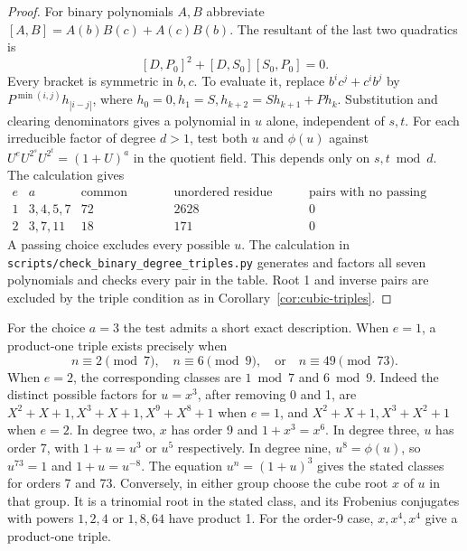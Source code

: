 \documentclass[11pt]{article}
\begin{document}
\begin{proof}
For binary polynomials \(A,B\) abbreviate
\([A,B]=A(b)B(c)+A(c)B(b)\). The resultant of the last two quadratics is
\[
            [D,P_0]^2+[D,S_0][S_0,P_0]=0.
\]
Every bracket is symmetric in \(b,c\). To evaluate it, replace
\(b^ic^j+c^ib^j\) by \(P^{\min(i,j)}h_{|i-j|}\), where
\(h_0=0,h_1=S,h_{k+2}=S h_{k+1}+P h_k\). Substitution and clearing
denominators gives a polynomial in \(u\) alone, independent of \(s,t\).
For each irreducible factor of degree \(d>1\), test both \(u\) and
\(\phi(u)\) against \(U^e U^{2^s}U^{2^t}=(1+U)^a\) in the quotient
field. This depends only on \(s,t\bmod d\). The calculation gives
\[
\begin{array}{c|l|r|r|r}
 e & a & \text{common period} & \text{unordered residue pairs} &
       \text{pairs with no passing choice}\\ \hline
 1&3,4,5,7&72&2628&0\\
 2&3,7,11&18&171&0
\end{array}
\]
A passing choice excludes every possible \(u\). The calculation in
\nolinkurl{scripts/check_binary_degree_triples.py} generates and factors
all seven polynomials and checks every pair in the table. Root 1 and
inverse pairs are excluded by the triple condition as in
Corollary~\ref{cor:cubic-triples}.
\end{proof}

For the choice \(a=3\) the test admits a short exact description.
When \(e=1\), a product-one triple exists precisely when
\[
           n\equiv2\pmod7,\quad n\equiv6\pmod9,\quad\text{or}\quad
           n\equiv49\pmod{73}.
\]
When \(e=2\), the corresponding classes are \(1\bmod7\) and \(6\bmod9\).
Indeed the distinct possible factors for \(u=x^3\), after removing 0 and 1,
are \(X^2+X+1,X^3+X+1,X^9+X^8+1\) when \(e=1\), and
\(X^2+X+1,X^3+X^2+1\) when \(e=2\). In degree two, \(x\) has order 9
and \(1+x^3=x^6\). In degree three, \(u\) has order 7, with
\(1+u=u^3\) or \(u^5\) respectively. In degree nine, \(u^8=\phi(u)\),
so \(u^{73}=1\) and \(1+u=u^{-8}\). The equation \(u^n=(1+u)^3\)
gives the stated classes for orders 7 and 73. Conversely, in either group
choose the cube root \(x\) of \(u\) in that group. It is a trinomial
root in the stated class, and its Frobenius conjugates with powers
\(1,2,4\) or \(1,8,64\) have product 1. For the order-9 case,
\(x,x^4,x^4\) give a product-one triple.
\end{document}
